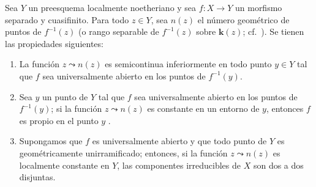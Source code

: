 \begin{proposition}[15.5.1]
\label{IV.15.5.1}
Sea $Y$ un preesquema localmente noetheriano y sea $f:X\to Y$ un morfismo separado y cuasifinito.
Para todo $z\in Y$, sea $n(z)$ el número geométrico de puntos de $f^{-1}(z)$ \textup{(o} rango separable \textup{de} $f^{-1}(z)$ \textup{sobre} $\boldsymbol{k}(z)$\textup{; cf.\ )}.
Se tienen las propiedades siguientes:
\begin{enumerate}[label=(\roman*)]
  \item La función $z\leadsto n(z)$ es semicontinua inferiormente en todo punto $y\in Y$ tal que $f$ sea universalmente abierto en los puntos de $f^{-1}(y)$.
  \item Sea $y$ un punto de $Y$ tal que $f$ sea universalmente abierto en los puntos de $f^{-1}(y)$; si la función $z\leadsto n(z)$ es constante en un entorno de $y$, entonces $f$ es propio en el punto $y$ .
  \item Supongamos que $f$ es universalmente abierto y que todo punto de $Y$ es geométricamente unirramificado; entonces, si la función $z\leadsto n(z)$ es localmente constante en $Y$, las componentes irreducibles de $X$ son dos a dos disjuntas.
\end{enumerate}
\end{proposition}

